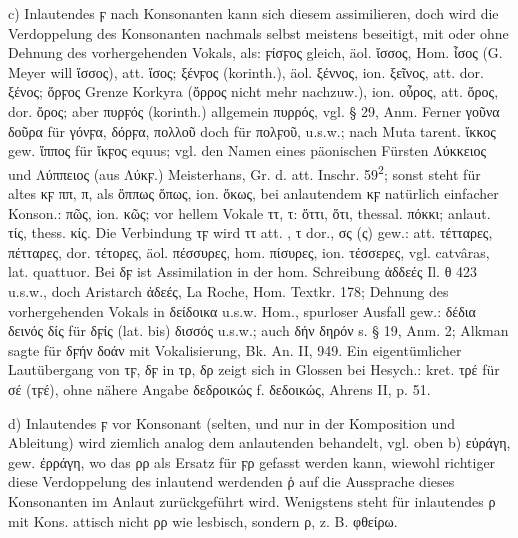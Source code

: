 c) Inlautendes ϝ nach Konsonanten kann sich diesem assimilieren, doch wird die
Verdoppelung des Konsonanten nachmals selbst meistens beseitigt, mit oder ohne
Dehnung des vorhergehenden Vokals, als: ϝίσϝος gleich, äol. ἴσσος, Hom. ἶσος (G.
Meyer will ἴσσος), att. ἴσος; ξένϝος (korinth.), äol. ξέννος, ion. ξεῖνος, att.
dor. ξένος; ὅρϝος Grenze Korkyra (ὅρρος nicht mehr nachzuw.), ion. οὖρος, att.
ὅρος, dor. ὄρος; aber πυρϝός (korinth.) allgemein πυρρός, vgl. § 29, Anm. Ferner
γοῦνα δοῦρα für γόνϝα, δόρϝα, πολλοῦ doch für πολϝοῦ, u.s.w.; nach Muta
tarent. ἴκκος gew. ἵππος für ἴκϝος equus; vgl. den Namen eines päonischen
Fürsten Λύκκειος und Λύππειος (aus Λύκϝ.) Meisterhans, Gr. d. att. Inschr.
59\textsuperscript{2}; sonst steht für altes κϝ ππ, π, als ὅππως ὅπως, ion.
ὅκως, bei anlautendem κϝ natürlich einfacher Konson.: πῶς, ion. κῶς; vor hellem
Vokale ττ, τ: ὅττι, ὅτι, thessal. πόκκι; anlaut. τίς, thess. κίς. Die Verbindung
τϝ wird ττ att. , τ dor., σς (ς) gew.: att. τέτταρες,  πέτταρες, dor.
τέτορες, äol. πέσσυρες, hom. πίσυρες, ion. τέσσερες, vgl.  catvâras,
lat. quattuor. Bei δϝ ist Assimilation in der hom. Schreibung ἀδδεές Il. θ 423
u.s.w., doch Aristarch ἀδεές, La Roche, Hom. Textkr. 178; Dehnung des
vorhergehenden Vokals in δείδοικα u.s.w. Hom., spurloser Ausfall gew.: δέδια
δεινός δίς für δϝίς (lat. bis) δισσός u.s.w.; auch δήν δηρόν s. § 19, Anm. 2;
Alkman sagte für δϝήν δοάν mit Vokalisierung, Bk. An. II, 949. Ein
eigentümlicher Lautübergang von τϝ, δϝ in τρ, δρ zeigt sich in Glossen bei
Hesych.: kret. τρέ für σέ (τϝέ), ohne nähere Angabe δεδροικώς f. δεδοικώς,
Ahrens II, p. 51. 

d) Inlautendes ϝ vor Konsonant (selten, und nur in der Komposition und
Ableitung) wird ziemlich analog dem anlautenden behandelt, vgl. oben b) εὐράγη,
gew. ἐρράγη, wo das ρρ als Ersatz für ϝρ gefasst werden kann, wiewohl richtiger
diese Verdoppelung des inlautend werdenden ῥ auf die Aussprache dieses
Konsonanten im Anlaut zurückgeführt wird. Wenigstens steht für inlautendes ρ mit
Kons. attisch nicht ρρ wie lesbisch, sondern ρ, z. B. φθείρω.

